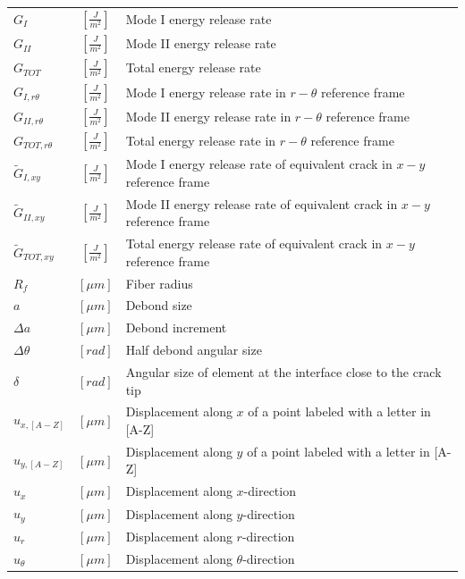 \documentclass[a4paper]{jpconf}
\begin{document}
\begin{tabular}{lcl}
$G_{I}$ & $\left[\frac{J}{m^{2}}\right]$  & Mode I energy release rate\\
$G_{II}$ & $\left[\frac{J}{m^{2}}\right]$  & Mode II energy release rate\\
$G_{TOT}$ & $\left[\frac{J}{m^{2}}\right]$  & Total energy release rate\\
$G_{I,r\theta}$ & $\left[\frac{J}{m^{2}}\right]$  & Mode I energy release rate in $r-\theta$ reference frame\\
$G_{II,r\theta}$ & $\left[\frac{J}{m^{2}}\right]$  & Mode II energy release rate in $r-\theta$ reference frame\\
$G_{TOT,r\theta}$ & $\left[\frac{J}{m^{2}}\right]$  & Total energy release rate in $r-\theta$ reference frame\\
$\widetilde{G}_{I,xy}$ & $\left[\frac{J}{m^{2}}\right]$  & Mode I energy release rate of equivalent crack in $x-y$ reference frame\\
$\widetilde{G}_{II,xy}$ & $\left[\frac{J}{m^{2}}\right]$  & Mode II energy release rate of equivalent crack in $x-y$ reference frame\\
$\widetilde{G}_{TOT,xy}$ & $\left[\frac{J}{m^{2}}\right]$  & Total energy release rate of equivalent crack in $x-y$ reference frame\\
$R_{f}$ & $\left[\mu m\right]$  &Fiber radius\\
$a$ & $\left[\mu m\right]$  &Debond size\\
$\Delta a$ & $\left[\mu m\right]$  &Debond increment\\
$\Delta\theta$ & $\left[rad\right]$  & Half debond angular size\\
$\delta$ & $\left[rad\right]$  & Angular size of element at the interface close to the crack tip\\
$u_{x,[A-Z]}$ & $\left[\mu m\right]$  & Displacement along $x$ of a point labeled with a letter in [A-Z]\\
$u_{y,[A-Z]}$ & $\left[\mu m\right]$  & Displacement along $y$ of a point labeled with a letter in [A-Z]\\
$u_{x}$ & $\left[\mu m\right]$  & Displacement along $x$-direction\\
$u_{y}$ & $\left[\mu m\right]$  & Displacement along $y$-direction\\
$u_{r}$ & $\left[\mu m\right]$  & Displacement along $r$-direction\\
$u_{\theta}$ & $\left[\mu m\right]$  & Displacement along $\theta$-direction\\

\end{tabular}
\end{document}
